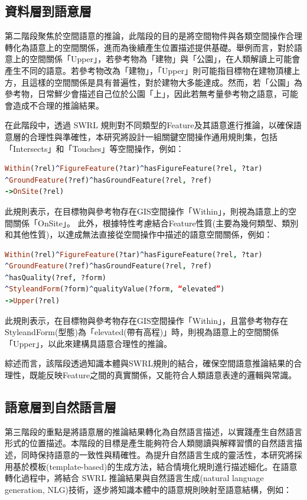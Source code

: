 \subsection{資料層到語意層}

第二階段聚焦於空間語意的推論，此階段的目的是將空間物件與各類空間操作合理轉化為語意上的空間關係，進而為後續產生位置描述提供基礎。舉例而言，對於語意上的空間關係「Upper」，若參考物為「建物」與「公園」，在人類解讀上可能會產生不同的語意。若參考物改為「建物」，「Upper」則可能指目標物在建物頂樓上方，且這樣的空間關係是具有普遍性，對於建物大多能達成。然而，若「公園」為參考物，日常鮮少會描述自己位於公園「上」，因此若無考量參考物之語意，可能會造成不合理的推論結果。

在此階段中，透過 SWRL 規則對不同類型的Feature及其語意進行推論，以確保語意層的合理性與準確性，本研究將設計一組關鍵空間操作通用規則集，包括「Intersects」和「Touches」等空間操作，例如：

\begin{lstlisting}[language=Prolog, basicstyle=\ttfamily, xleftmargin=2em]
Within(?rel)^FigureFeature(?tar)^hasFigureFeature(?rel, ?tar)
^GroundFeature(?ref)^hasGroundFeature(?rel, ?ref)
->OnSite(?rel)
\end{lstlisting}

此規則表示，在目標物與參考物存在GIS空間操作「Within」，則視為語意上的空間關係「OnSite」。
此外，根據特性考慮結合Feature性質(主要為幾何類型、類別和其他性質)，以達成無法直接從空間操作中描述的語意空間關係，例如：

\begin{lstlisting}[language=Prolog, basicstyle=\ttfamily, xleftmargin=2em]
Within(?rel)^FigureFeature(?tar)^hasFigureFeature(?rel, ?tar)
^GroundFeature(?ref)^hasGroundFeature(?rel, ?ref)
^hasQuality(?ref, ?form)
^StyleandForm(?form)^qualityValue(?form, “elevated”)
->Upper(?rel)
\end{lstlisting}

此規則表示，在目標物與參考物存在GIS空間操作「Within」，且當參考物存在StyleandForm(型態)為「elevated(帶有高程)」時，則視為語意上的空間關係「Upper」，以此來建構具語意合理性的推論。

綜述而言，該階段透過知識本體與SWRL規則的結合，確保空間語意推論結果的合理性，既能反映Feature之間的真實關係，又能符合人類語意表達的邏輯與常識。

\subsection{語意層到自然語言層}

第三階段的重點是將語意層的推論結果轉化為自然語言描述，以實踐產生自然語言形式的位置描述。本階段的目標是產生能夠符合人類閱讀與解釋習慣的自然語言描述，同時保持語意的一致性與精確性。為提升自然語言生成的靈活性，本研究將採用基於模板(template-based)的生成方法，結合情境化規則進行描述細化。在語意轉化過程中，將結合 SWRL 推論結果與自然語言生成(natural language generation, NLG)技術，逐步將知識本體中的語意規則映射至語意結構，例如：

